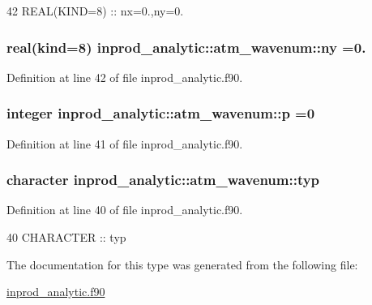 \begin{DoxyCode}
42      \textcolor{keywordtype}{REAL(KIND=8)} :: nx=0.,ny=0.
\end{DoxyCode}
\subsubsection[{\texorpdfstring{ny}{ny}}]{\setlength{\rightskip}{0pt plus 5cm}real(kind=8) inprod\+\_\+analytic\+::atm\+\_\+wavenum\+::ny =0.\hspace{0.3cm}{\ttfamily [private]}}\hypertarget{structinprod__analytic_1_1atm__wavenum_af75974631175c67689c588f6d92ceb3e}{}\label{structinprod__analytic_1_1atm__wavenum_af75974631175c67689c588f6d92ceb3e}


Definition at line 42 of file inprod\+\_\+analytic.\+f90.

\subsubsection[{\texorpdfstring{p}{p}}]{\setlength{\rightskip}{0pt plus 5cm}integer inprod\+\_\+analytic\+::atm\+\_\+wavenum\+::p =0\hspace{0.3cm}{\ttfamily [private]}}\hypertarget{structinprod__analytic_1_1atm__wavenum_a5a938641d8939931bc4eb71499298a6a}{}\label{structinprod__analytic_1_1atm__wavenum_a5a938641d8939931bc4eb71499298a6a}


Definition at line 41 of file inprod\+\_\+analytic.\+f90.

\subsubsection[{\texorpdfstring{typ}{typ}}]{\setlength{\rightskip}{0pt plus 5cm}character inprod\+\_\+analytic\+::atm\+\_\+wavenum\+::typ\hspace{0.3cm}{\ttfamily [private]}}\hypertarget{structinprod__analytic_1_1atm__wavenum_a1c12be211e96c5a773aae4c2146a3792}{}\label{structinprod__analytic_1_1atm__wavenum_a1c12be211e96c5a773aae4c2146a3792}


Definition at line 40 of file inprod\+\_\+analytic.\+f90.


\begin{DoxyCode}
40      \textcolor{keywordtype}{CHARACTER} :: typ
\end{DoxyCode}


The documentation for this type was generated from the following file\+:\begin{DoxyCompactItemize}
\item 
\hyperlink{inprod__analytic_8f90}{inprod\+\_\+analytic.\+f90}\end{DoxyCompactItemize}
